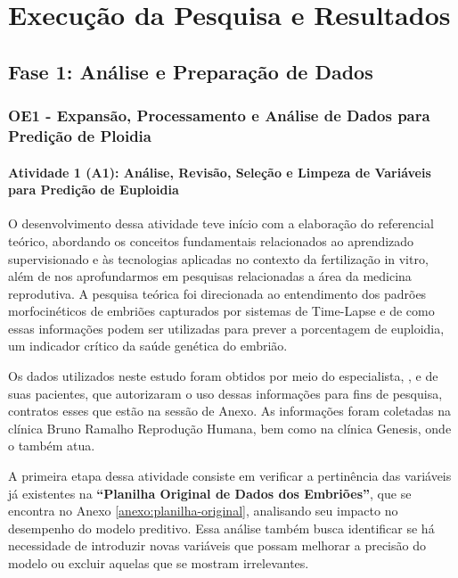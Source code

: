 
\chapter[Execução da Pesquisa e Resultados]{Execução da Pesquisa e Resultados}

\section{Fase 1: Análise e Preparação de Dados}
\subsection{OE1 - Expansão, Processamento e Análise de Dados para Predição de Ploidia}
\subsubsection{Atividade 1 (A1): Análise, Revisão, Seleção e Limpeza de Variáveis para Predição de Euploidia}
O desenvolvimento dessa atividade teve início com a elaboração do referencial teórico, abordando os conceitos fundamentais relacionados ao aprendizado supervisionado e às tecnologias aplicadas no contexto da fertilização in vitro, além de nos aprofundarmos em pesquisas relacionadas a área da medicina reprodutiva. A pesquisa teórica foi direcionada ao entendimento dos padrões morfocinéticos de embriões capturados por sistemas de Time-Lapse e de como essas informações podem ser utilizadas para prever a porcentagem de euploidia, um indicador crítico da saúde genética do embrião.

Os dados utilizados neste estudo foram obtidos por meio do especialista, , e de suas pacientes, que autorizaram o uso dessas informações para fins de pesquisa, contratos esses que estão na sessão de Anexo. As informações foram coletadas na clínica Bruno Ramalho Reprodução Humana, bem como na clínica Genesis, onde o  também atua.

A primeira etapa dessa atividade consiste em verificar a pertinência das variáveis já existentes na \textbf{“Planilha Original de Dados dos Embriões”}, que se encontra no Anexo \ref{anexo:planilha-original}, analisando seu impacto no desempenho do modelo preditivo. Essa análise também busca identificar se há necessidade de introduzir novas variáveis que possam melhorar a precisão do modelo ou excluir aquelas que se mostram irrelevantes.

